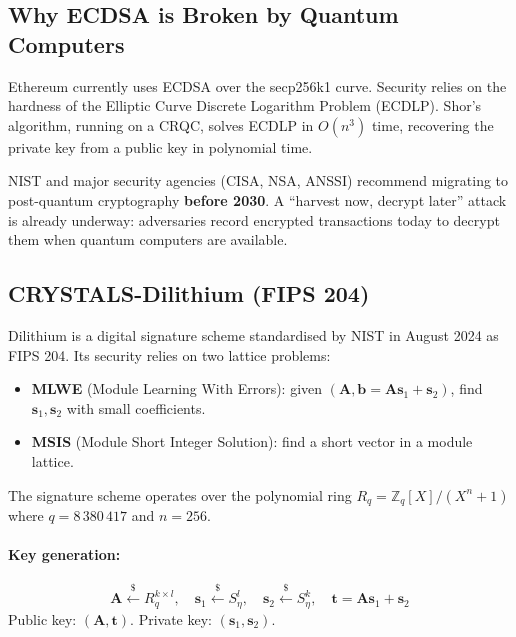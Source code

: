 \documentclass[11pt,a4paper]{article}
\begin{document}
\subsection{Why ECDSA is Broken by Quantum Computers}

Ethereum currently uses ECDSA over the secp256k1 curve. Security relies on the hardness of the Elliptic Curve Discrete Logarithm Problem (ECDLP). Shor's algorithm, running on a CRQC, solves ECDLP in $O(n^3)$ time, recovering the private key from a public key in polynomial time.

\begin{warningbox}
NIST and major security agencies (CISA, NSA, ANSSI) recommend migrating to post-quantum cryptography \textbf{before 2030}. A ``harvest now, decrypt later'' attack is already underway: adversaries record encrypted transactions today to decrypt them when quantum computers are available.
\end{warningbox}

\subsection{CRYSTALS-Dilithium (FIPS 204)}

Dilithium is a digital signature scheme standardised by NIST in August 2024 as FIPS 204. Its security relies on two lattice problems:

\begin{itemize}
  \item \textbf{MLWE} (Module Learning With Errors): given $(\mathbf{A}, \mathbf{b} = \mathbf{A}\mathbf{s}_1 + \mathbf{s}_2)$, find $\mathbf{s}_1, \mathbf{s}_2$ with small coefficients.
  \item \textbf{MSIS} (Module Short Integer Solution): find a short vector in a module lattice.
\end{itemize}

The signature scheme operates over the polynomial ring $R_q = \mathbb{Z}_q[X]/(X^n+1)$ where $q = 8\,380\,417$ and $n = 256$.

\paragraph{Key generation:}
\[
  \mathbf{A} \xleftarrow{\$} R_q^{k \times l}, \quad
  \mathbf{s}_1 \xleftarrow{\$} S_\eta^l, \quad
  \mathbf{s}_2 \xleftarrow{\$} S_\eta^k, \quad
  \mathbf{t} = \mathbf{A}\mathbf{s}_1 + \mathbf{s}_2
\]
Public key: $(\mathbf{A}, \mathbf{t})$. Private key: $(\mathbf{s}_1, \mathbf{s}_2)$.
\end{document}
